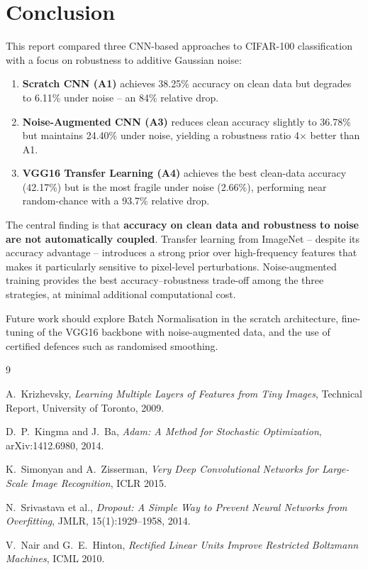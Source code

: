 \documentclass[12pt,a4paper]{article}
\begin{document}
\section{Conclusion}

This report compared three CNN-based approaches to CIFAR-100 classification with a focus on robustness to additive Gaussian noise:

\begin{enumerate}[noitemsep]
    \item \textbf{Scratch CNN (A1)} achieves 38.25\% accuracy on clean data but degrades to 6.11\% under noise -- an 84\% relative drop.
    \item \textbf{Noise-Augmented CNN (A3)} reduces clean accuracy slightly to 36.78\% but maintains 24.40\% under noise, yielding a robustness ratio 4$\times$ better than A1.
    \item \textbf{VGG16 Transfer Learning (A4)} achieves the best clean-data accuracy (42.17\%) but is the most fragile under noise (2.66\%), performing near random-chance with a 93.7\% relative drop.
\end{enumerate}

The central finding is that \textbf{accuracy on clean data and robustness to noise are not automatically coupled}. Transfer learning from ImageNet -- despite its accuracy advantage -- introduces a strong prior over high-frequency features that makes it particularly sensitive to pixel-level perturbations. Noise-augmented training provides the best accuracy--robustness trade-off among the three strategies, at minimal additional computational cost.

Future work should explore Batch Normalisation in the scratch architecture, fine-tuning of the VGG16 backbone with noise-augmented data, and the use of certified defences such as randomised smoothing.

\begin{thebibliography}{9}

A.~Krizhevsky, \textit{Learning Multiple Layers of Features from Tiny Images}, Technical Report, University of Toronto, 2009.

D.~P.~Kingma and J.~Ba, \textit{Adam: A Method for Stochastic Optimization}, arXiv:1412.6980, 2014.

K.~Simonyan and A.~Zisserman, \textit{Very Deep Convolutional Networks for Large-Scale Image Recognition}, ICLR 2015.

N.~Srivastava et al., \textit{Dropout: A Simple Way to Prevent Neural Networks from Overfitting}, JMLR, 15(1):1929--1958, 2014.

V.~Nair and G.~E.~Hinton, \textit{Rectified Linear Units Improve Restricted Boltzmann Machines}, ICML 2010.

\end{thebibliography}
\end{document}

